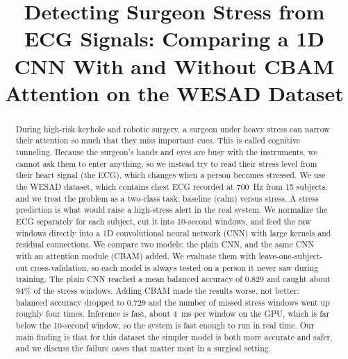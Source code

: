 \documentclass[conference]{IEEEtran}
\begin{document}
\title{Detecting Surgeon Stress from ECG Signals: Comparing a 1D CNN
With and Without CBAM Attention on the WESAD Dataset}

\author{
}

\maketitle

\begin{abstract}
During high-risk keyhole and robotic surgery, a surgeon under heavy stress can
narrow their attention so much that they miss important cues. This is called
cognitive tunneling. Because the surgeon's hands and eyes are busy with the
instruments, we cannot ask them to enter anything, so we instead try to read
their stress level from their heart signal (the ECG), which changes when a
person becomes stressed. We use the WESAD dataset, which contains chest ECG
recorded at 700~Hz from 15 subjects, and we treat the problem as a two-class
task: baseline (calm) versus stress. A stress prediction is what would raise a
high-stress alert in the real system. We normalize the ECG separately for each
subject, cut it into 10-second windows, and feed the raw windows directly into
a 1D convolutional neural network (CNN) with large kernels and residual
connections. We compare two models: the plain CNN, and the same CNN with an
attention module (CBAM) added. We evaluate them with leave-one-subject-out
cross-validation, so each model is always tested on a person it never saw
during training. The plain CNN reached a mean balanced accuracy of 0.829 and
caught about 94\% of the stress windows. Adding CBAM made the results worse,
not better: balanced accuracy dropped to 0.729 and the number of missed stress
windows went up roughly four times. Inference is fast, about 4~ms per window on
the GPU, which is far below the 10-second window, so the system is fast enough
to run in real time. Our main finding is that for this dataset the simpler
model is both more accurate and safer, and we discuss the failure cases that
matter most in a surgical setting.
\end{abstract}
\end{document}
